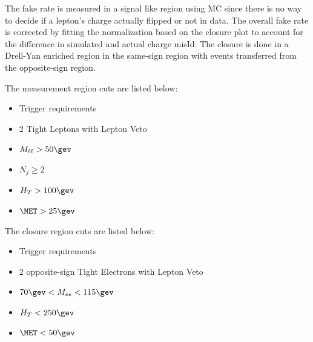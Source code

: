 The fake rate is measured in a signal like region using MC since there is no way to decide if a lepton's charge actually flipped or not in data. The overall fake rate is corrected by fitting the normalization based on the closure plot to account for the difference in simulated and actual charge misId. The closure is done in a Drell-Yan enriched region in the same-sign region with events transferred from the opposite-sign region.

The measurement region cuts are listed below:

\begin{itemize}
  \item Trigger requirements
  \item 2 Tight Leptons with Lepton Veto
  \item $M_{\ell\ell} > 50\gev$
  \item $N_{j} \ge 2$
  \item $H_{T} > 100\gev$
  \item $\MET > 25\gev$
\end{itemize}

The closure region cuts are listed below:

\begin{itemize}
  \item Trigger requirements
  \item 2 opposite-sign Tight Electrons with Lepton Veto
  \item $70\gev < M_{ee} < 115\gev$
  \item $H_{T} < 250\gev$
  \item $\MET < 50\gev$
\end{itemize}

% 

